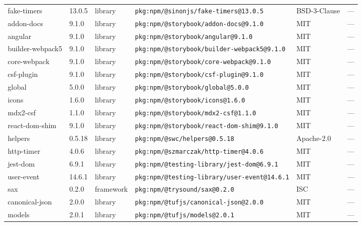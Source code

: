 \documentclass[11pt,a4paper]{article}
\begin{document}
\begin{longtable}{|p{4cm}|p{2cm}|p{1.6cm}|p{5cm}|p{1.5cm}|p{3.5cm}|}
\raggedright fake-timers & 13.0.5 & library & \small\texttt{pkg:npm/@sinonjs/fake-timers@13.0.5} & BSD-3-Clause & \small — \\
\raggedright addon-docs & 9.1.0 & library & \small\texttt{pkg:npm/@storybook/addon-docs@9.1.0} & MIT & \small — \\
\raggedright angular & 9.1.0 & library & \small\texttt{pkg:npm/@storybook/angular@9.1.0} & MIT & \small — \\
\raggedright builder-webpack5 & 9.1.0 & library & \small\texttt{pkg:npm/@storybook/builder-webpack5@9.1.0} & MIT & \small — \\
\raggedright core-webpack & 9.1.0 & library & \small\texttt{pkg:npm/@storybook/core-webpack@9.1.0} & MIT & \small — \\
\raggedright csf-plugin & 9.1.0 & library & \small\texttt{pkg:npm/@storybook/csf-plugin@9.1.0} & MIT & \small — \\
\raggedright global & 5.0.0 & library & \small\texttt{pkg:npm/@storybook/global@5.0.0} & MIT & \small — \\
\raggedright icons & 1.6.0 & library & \small\texttt{pkg:npm/@storybook/icons@1.6.0} & MIT & \small — \\
\raggedright mdx2-csf & 1.1.0 & library & \small\texttt{pkg:npm/@storybook/mdx2-csf@1.1.0} & MIT & \small — \\
\raggedright react-dom-shim & 9.1.0 & library & \small\texttt{pkg:npm/@storybook/react-dom-shim@9.1.0} & MIT & \small — \\
\raggedright helpers & 0.5.18 & library & \small\texttt{pkg:npm/@swc/helpers@0.5.18} & Apache-2.0 & \small — \\
\raggedright http-timer & 4.0.6 & library & \small\texttt{pkg:npm/@szmarczak/http-timer@4.0.6} & MIT & \small — \\
\raggedright jest-dom & 6.9.1 & library & \small\texttt{pkg:npm/@testing-library/jest-dom@6.9.1} & MIT & \small — \\
\raggedright user-event & 14.6.1 & library & \small\texttt{pkg:npm/@testing-library/user-event@14.6.1} & MIT & \small — \\
\raggedright sax & 0.2.0 & framework & \small\texttt{pkg:npm/@trysound/sax@0.2.0} & ISC & \small — \\
\raggedright canonical-json & 2.0.0 & library & \small\texttt{pkg:npm/@tufjs/canonical-json@2.0.0} & MIT & \small — \\
\raggedright models & 2.0.1 & library & \small\texttt{pkg:npm/@tufjs/models@2.0.1} & MIT & \small — \\

\end{longtable}
\end{document}

